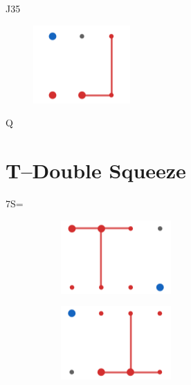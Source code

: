 \documentclass[14pt, a4paper]{extreport}
\begin{document}
        {}
        {}
        {}
        {}

\vspace{0.3cm}

\hspace{6.3cm}\diams{}J\hspace{0.4cm}\spades{}3\hspace{0.4cm}\clubs{}5 
\vspace{-0.5cm}
\begin{figure}[H]
    \centering
    \includegraphics[scale=0.7]{./squeezes/positional_reverted.png}
\end{figure}
\vspace{-0.9cm}
\hspace{6.3cm}\spades{}Q\hspace{0.4cm}\hspace{0.4cm} 

\vspace{-3cm}
\hspace{10cm}

\vspace{-0.2cm}
\hspace{10cm}

\newpage
\section*{T--Double Squeeze}

7\spades{}S=

\vspace{0.7cm}
\begin{figure}[H]
    \centering
    \begin{subfigure}{0.4\textwidth}
        \centering
        \includegraphics[scale=0.7]{./squeezes/double_T.png}
    \end{subfigure}
    \begin{subfigure}{0.4\textwidth}
        \centering
        \includegraphics[scale=0.7]{./squeezes/double_T_reverted.png}
    \end{subfigure}
\end{figure}
\end{document}
